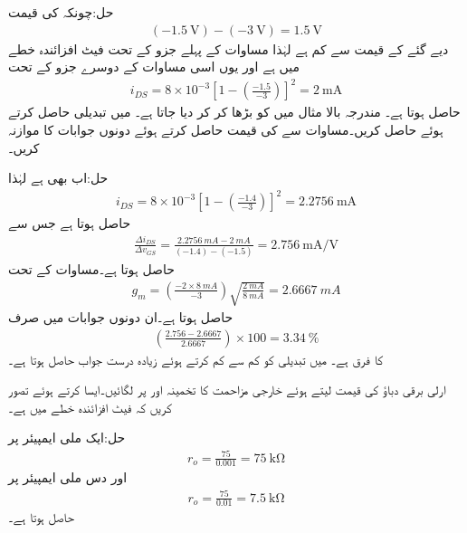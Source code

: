 حل:چونکہ  کی قیمت 
\begin{align*}
(\SI{-1.5}{\volt})-(\SI{-3}{\volt})=\SI{1.5}{\volt}
\end{align*}
دیے گئے  کے قیمت سے کم ہے لہٰذا مساوات  کے پہلے جزو کے تحت فیٹ افزائندہ خطے میں ہے اور یوں اسی مساوات کے دوسرے جزو کے تحت
\begin{align*}
i_{DS}=8 \times 10^{-3} \left[1-\left(\frac{-1.5}{-3} \right) \right]^2= \SI{2}{\milli \ampere}
\end{align*}
حاصل ہوتا ہے۔
مندرجہ بالا مثال میں  کو بڑھا کر   کر دیا جاتا ہے۔ میں تبدیلی حاصل کرتے ہوئے  حاصل کریں۔مساوات  سے  کی قیمت حاصل کرتے ہوئے دونوں جوابات کا موازنہ کریں۔

حل:اب بھی  ہے لہٰذا
\begin{align*}
i_{DS}=8 \times 10^{-3} \left[1-\left(\frac{-1.4}{-3} \right) \right]^2= \SI{2.2756}{\milli \ampere}
\end{align*}
حاصل ہوتا ہے جس سے
\begin{align*}
\frac{\Delta i_{DS}}{\Delta v_{GS}}=\frac{\SI{2.2756}{mA}-\SI{2}{mA}}{(-1.4)-(-1.5)}=\SI{2.756}{\milli \ampere \per \volt}
\end{align*}
حاصل ہوتا ہے۔مساوات  کے تحت
\begin{align*}
g_m=\left(\frac{-2 \times \SI{8}{mA}}{-3} \right) \sqrt{\frac{\SI{2}{mA}}{\SI{8}{mA}}}=\SI{2.6667}{mA}
\end{align*} 
حاصل ہوتا ہے۔ان دونوں جوابات میں صرف
\begin{align*}
\left(\frac{2.756-2.6667}{2.6667} \right) \times 100=\SI{3.34}{\percent}
\end{align*}
کا فرق ہے۔ میں تبدیلی کو کم سے کم کرتے ہوئے زیادہ درست جواب حاصل ہوتا ہے۔  

ارلی برقی دباؤ  کی قیمت  لیتے ہوئے خارجی مزاحمت  کا تخمینہ  اور  پر لگائیں۔ایسا کرتے ہوئے تصور کریں کہ فیٹ افزائندہ خطے میں ہے۔

حل:ایک ملی ایمپیئر پر
\begin{align*}
r_o=\frac{75}{0.001}=\SI{75}{\kilo \ohm}
\end{align*}
اور دس ملی ایمپیئر پر
\begin{align*}
r_o=\frac{75}{0.01}=\SI{7.5}{\kilo \ohm}
\end{align*}
حاصل ہوتا ہے۔

